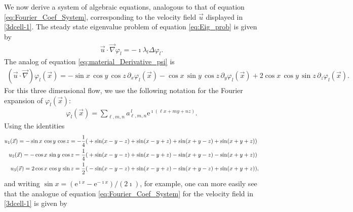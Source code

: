 \documentclass[11pt]{amsart}
\newcommand{\e}{\mathrm{e}}
\begin{document}

We now derive a system of algebraic equations, analogous to that of
equation \eqref{eq:Fourier_Coef_System}, corresponding to the velocity
field $\vec{u}$ displayed in \eqref{3dcell-1}. The steady state
eigenvalue problem of equation \eqref{eq:Eig_prob} is given by
%
\begin{align}\label{eq:Steady_Eig_prob}
  \vec{u}\cdot\vec{\nabla}\varphi_l=-\imath\lambda_l\Delta\varphi_l.
\end{align}
%
The analog of equation \eqref{eq:material_Derivative_psi} is
%
\begin{align}\label{eq:Steady_material_Derivative_psi}
  (\vec{u}\cdot\vec{\nabla})\varphi_l(\vec{x})=
         -\sin{x}\,\cos{y}\,\cos{z}\,\partial_x\varphi_l(\vec{x})
         -\cos{x}\,\sin{y}\,\cos{z}\,\partial_y\varphi_l(\vec{x})
         +2\cos{x}\,\cos{y}\,\sin{z}\,\partial_z\varphi_l(\vec{x}).
\end{align}
%
For this three dimensional flow, we use the following notation for the
Fourier expansion of $\varphi_l(\vec{x})$:
%
\begin{align}
  \varphi_l(\vec{x})=\sum_{\ell,m,n}a^{\,l}_{\ell,m,n}\e^{\imath (\ell x+my+nz)}.
\end{align}
%
Using the identities
%
\begin{align}\label{eq:Velocity_Field_3D}
  u_1(\vec{x})=-\sin{x}\,\cos{y}\,\cos{z}
     =-\frac{1}{4}(&+\sin(x-y-z)+\sin(x-y+z)+\sin(x+y-z)+\sin(x+y+z))
     \notag\\
  u_2(\vec{x})=-\cos{x}\,\sin{y}\,\cos{z}
     =\frac{1}{4}(&+\sin(x-y-z)+\sin(x-y+z)-\sin(x+y-z)-\sin(x+y+z))
     \notag\\
  u_3(\vec{x})=2\cos{x}\,\cos{y}\,\sin{z}
     =\frac{1}{2}(&-\sin(x-y-z)+\sin(x-y+z)-\sin(x+y-z)+\sin(x+y+z)),   
\end{align}
%
and writing $\sin{x}=(\e^{\imath x}-\e^{-\imath x})/(2\imath)$, for example, one can
more easily see that the analogue of equation
\eqref{eq:Fourier_Coef_System} for the velocity field in
\eqref{3dcell-1} is given by 
%
\end{document}
